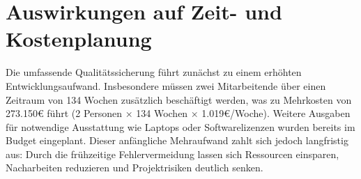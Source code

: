 \section{Auswirkungen auf Zeit- und Kostenplanung}

Die umfassende Qualitätssicherung führt zunächst zu einem erhöhten Entwicklungsaufwand. Insbesondere müssen zwei Mitarbeitende über einen Zeitraum von 134 Wochen zusätzlich beschäftigt werden, was zu Mehrkosten von 273.150€ führt (2 Personen × 134 Wochen × 1.019€/Woche). Weitere Ausgaben für notwendige Ausstattung wie Laptops oder Softwarelizenzen wurden bereits im Budget eingeplant. Dieser anfängliche Mehraufwand zahlt sich jedoch langfristig aus: Durch die frühzeitige Fehlervermeidung lassen sich Ressourcen einsparen, Nacharbeiten reduzieren und Projektrisiken deutlich senken.